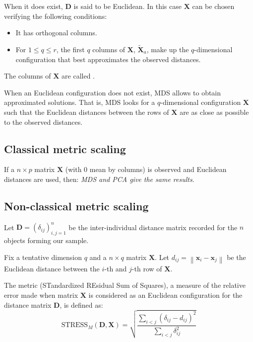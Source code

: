When it does exist, $\boldsymbol{D}$ is said to be Euclidean. In this
case $\boldsymbol{X}$ can be chosen verifying the following conditions:
\begin{itemize}
    \item It has orthogonal columns.
    \item For $1 \leq q \leq r$, the first $q$ columns of $\boldsymbol{X}$,
        $\boldsymbol{\tilde{X}}_a$, make up the $q$-dimensional configuration that
        best approximates the observed distances.
\end{itemize}
The columns of $\boldsymbol{X}$ are called .

When an Euclidean configuration does not exist, MDS allows to
obtain approximated solutions. That is, MDS looks for a $q$-dimensional
configuration $\boldsymbol{X}$ such that the Euclidean distances between
the rows of $\boldsymbol{X}$ are as close as possible to the observed
distances.

\subsection{Classical metric scaling}

If a $n \times p$ matrix $\boldsymbol{X}$ (with 0 mean by columns) is observed
and Euclidean distances are used, then: \emph{MDS and PCA give the same results}.

\subsection{Non-classical metric scaling}

Let $\boldsymbol{D} = (\delta_{ij})^n_{i,j=1}$ be the inter-individual distance
matrix recorded for the $n$ objects forming our sample.

Fix a tentative dimension $q$ and a $n \times q$ matrix $\boldsymbol{X}$.
Let $d_{ij} = \left\lVert \boldsymbol{x}_i - \boldsymbol{x}_j \right\rVert$ be the
Euclidean distance between the $i$-th and $j$-th row of $\boldsymbol{X}$.

The metric  (STandardized REsidual Sum of Squares), a measure
of the relative error made when matrix $\boldsymbol{X}$ is considered as
an Euclidean configuration for the distance matrix $\boldsymbol{D}$, is defined as:
\begin{equation*}
    \text{STRESS}_M(\boldsymbol{D}, \boldsymbol{X}) = \sqrt{\frac
        {\sum_{i<j}(\delta_{ij} - d_{ij})^2}
        {\sum_{i<j}\delta_{ij}^2}
    }
\end{equation*}

